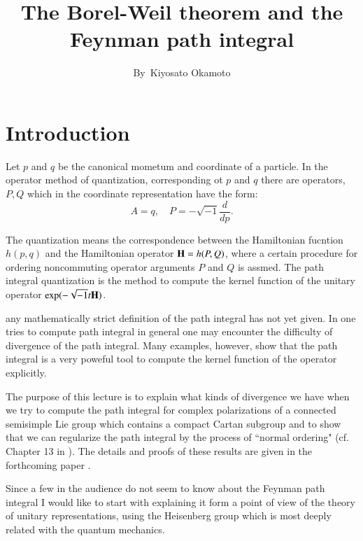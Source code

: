 \title{The Borel-Weil theorem and the Feynman path integral}

\author{By~Kiyosato Okamoto}


\date{}
\maketitle

\section*{Introduction}

Let $p$ and $q$ be the canonical mometum and coordinate of a particle. In the operator method of quantization, corresponding ot $p$ and $q$ there are operators, $P, Q$ which in the coordinate representation have the form:
$$
A=q, \quad P=-\sqrt{-1}\dfrac{d}{dp}.
$$

The quantization means the correspondence between the Hamiltonian fucntion $h(p, q)$ and the Hamiltonian operator $\mathbf{H}= h(P, Q)$, where a certain procedure for ordering noncommuting operator arguments $P$ and $Q$ is assmed. The path integral quantization is the method to compute the kernel function of the unitary operator $\exp(-\sqrt{-1}t \mathbf{H})$.

any mathematically strict definition of the path integral has not yet given. In one tries to compute path integral in general one may encounter the difficulty of divergence of the path integral. Many examples, however, show that the path integral is a very poweful tool to compute the kernel function of the operator explicitly.

The purpose of this lecture is to explain what kinds of divergence we have when we try to compute the path integral for complex polarizations of a connected semisimple Lie group which contains a compact Cartan subgroup and to show that we can regularize the path integral by the process of ``normal ordering" (cf. Chapter 13 in \cite{art15-key10}). The details and proofs of these results are given in the forthcoming paper \cite{art15-key7}.

Since a few in the audience do not seem to know about the Feynman path integral I would like to start with explaining it form a point of view of the theory of unitary representations, using the Heisenberg group which is most deeply related with the quantum mechanics.

